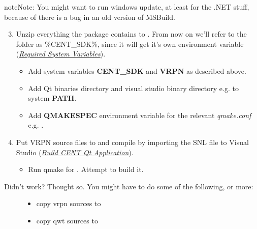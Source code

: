 \documentclass[letterpaper,10pt,english]{sphinxmanual}
\begin{document}
\begin{notice}{note}{Note:}
You might want to run windows update, at least for the .NET stuff, because of there is a bug in an old version of MSBuild.
\end{notice}
\begin{enumerate}
\setcounter{enumi}{2}
\item {} 
Unzip everything the package contains to . From now on we'll refer to the folder  as \%CENT\_SDK\%, since it will get it's own environment variable ({\hyperref[index:req-sys-vars]{\emph{Required System Variables}}}).
\begin{itemize}
\item {} 
Add system variables \textbf{CENT\_SDK} and \textbf{VRPN} as described above.

\item {} 
Add Qt binaries directory  and visual studio binary directory e.g.  to system \textbf{PATH}.

\item {} 
Add \textbf{QMAKESPEC} environment variable for the relevant \emph{qmake.conf} e.g. .

\end{itemize}

\item {} 
Put VRPN source files to  and compile by importing the SNL file to Visual Studio ({\hyperref[index:build-cent]{\emph{Build CENT Qt Application}}}).
\begin{itemize}
\item {} 
Run qmake for . Attempt to build it.

\end{itemize}

\end{enumerate}
\begin{description}
\item[{Didn't work? Thought so. You might have to do some of the following, or more:}] \leavevmode\begin{itemize}
\item {} 
copy vrpn sources to 

\item {} 
copy qwt sources to 

\end{itemize}

\end{description}
\end{document}
